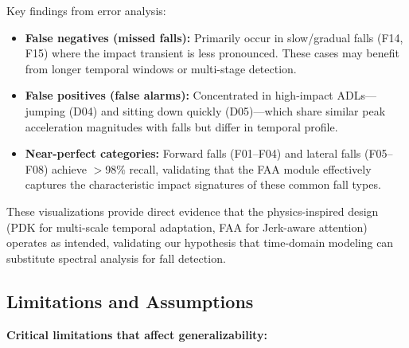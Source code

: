 \documentclass{article}
\begin{document}
Key findings from error analysis:
\begin{itemize}
    \item \textbf{False negatives (missed falls):} Primarily occur in slow/gradual falls (F14, F15) where the impact transient is less pronounced. These cases may benefit from longer temporal windows or multi-stage detection.
    \item \textbf{False positives (false alarms):} Concentrated in high-impact ADLs---jumping (D04) and sitting down quickly (D05)---which share similar peak acceleration magnitudes with falls but differ in temporal profile.
    \item \textbf{Near-perfect categories:} Forward falls (F01--F04) and lateral falls (F05--F08) achieve $>$98\% recall, validating that the FAA module effectively captures the characteristic impact signatures of these common fall types.
\end{itemize}

These visualizations provide direct evidence that the physics-inspired design (PDK for multi-scale temporal adaptation, FAA for Jerk-aware attention) operates as intended, validating our hypothesis that time-domain modeling can substitute spectral analysis for fall detection.

\subsection{Limitations and Assumptions}

\textbf{Critical limitations that affect generalizability:}
\end{document}
